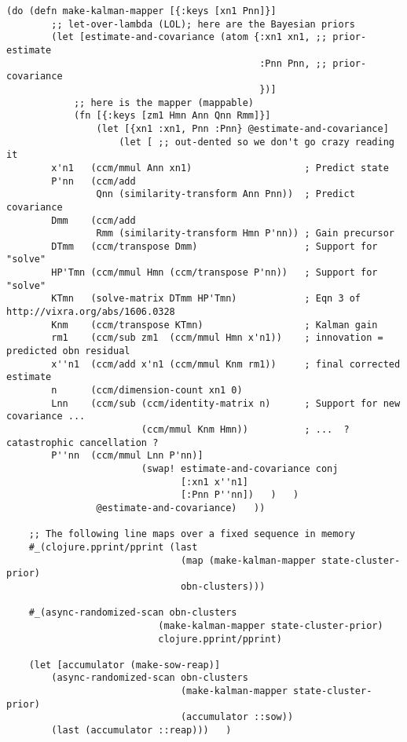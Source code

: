 \documentclass[10pt,oneside,x11names]{article}
\begin{document}
\begin{verbatim}
(do (defn make-kalman-mapper [{:keys [xn1 Pnn]}]
        ;; let-over-lambda (LOL); here are the Bayesian priors
        (let [estimate-and-covariance (atom {:xn1 xn1, ;; prior-estimate
                                             :Pnn Pnn, ;; prior-covariance
                                             })]
            ;; here is the mapper (mappable)
            (fn [{:keys [zm1 Hmn Ann Qnn Rmm]}]
                (let [{xn1 :xn1, Pnn :Pnn} @estimate-and-covariance]
                    (let [ ;; out-dented so we don't go crazy reading it
        x'n1   (ccm/mmul Ann xn1)                    ; Predict state
        P'nn   (ccm/add
                Qnn (similarity-transform Ann Pnn))  ; Predict covariance
        Dmm    (ccm/add
                Rmm (similarity-transform Hmn P'nn)) ; Gain precursor
        DTmm   (ccm/transpose Dmm)                   ; Support for "solve"
        HP'Tmn (ccm/mmul Hmn (ccm/transpose P'nn))   ; Support for "solve"
        KTmn   (solve-matrix DTmm HP'Tmn)            ; Eqn 3 of http://vixra.org/abs/1606.0328
        Knm    (ccm/transpose KTmn)                  ; Kalman gain
        rm1    (ccm/sub zm1  (ccm/mmul Hmn x'n1))    ; innovation = predicted obn residual
        x''n1  (ccm/add x'n1 (ccm/mmul Knm rm1))     ; final corrected estimate
        n      (ccm/dimension-count xn1 0)
        Lnn    (ccm/sub (ccm/identity-matrix n)      ; Support for new covariance ...
                        (ccm/mmul Knm Hmn))          ; ...  ? catastrophic cancellation ?
        P''nn  (ccm/mmul Lnn P'nn)]
                        (swap! estimate-and-covariance conj
                               [:xn1 x''n1]
                               [:Pnn P''nn])   )   )
                @estimate-and-covariance)   ))

    ;; The following line maps over a fixed sequence in memory
    #_(clojure.pprint/pprint (last
                               (map (make-kalman-mapper state-cluster-prior)
                               obn-clusters)))

    #_(async-randomized-scan obn-clusters
                           (make-kalman-mapper state-cluster-prior)
                           clojure.pprint/pprint)

    (let [accumulator (make-sow-reap)]
        (async-randomized-scan obn-clusters
                               (make-kalman-mapper state-cluster-prior)
                               (accumulator ::sow))
        (last (accumulator ::reap)))   )
\end{verbatim}
\end{document}
